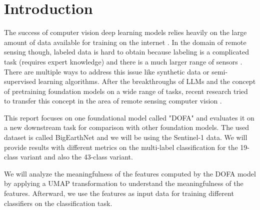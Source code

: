 \section{Introduction}
\label{sec:intro}

The success of computer vision deep learning models relies heavily on the large amount of data available for training on the internet \cite{8237359}.
In the domain of remote sensing though, labeled data is hard to obtain because labeling is a complicated task (requires expert knowledge) and there is a much larger range of sensors \cite{dofa}.
There are multiple ways to address this issue like synthetic data or semi-supervised learning algorithms. After the breakthroughs of LLMs and the concept of pretraining foundation models on a wide range of tasks, recent research tried to transfer this concept in the area of remote sensing computer vision \cite{bommasani2022opportunitiesrisksfoundationmodels}.

This report focuses on one foundational model called "DOFA" \cite{dofa}
and evaluates it on a new downstream task for comparison with other foundation models. The used dataset is called BigEarthNet \cite{bigearthnet}
and we will be using the Sentinel-1 data. We will provide results with different metrics on the multi-label classification for the 19-class variant and also the 43-class variant.

We will analyze the meaningfulness of the features computed by the DOFA model by applying a UMAP transformation \cite{umap-paper}
to understand the meaningfulness of the features. Afterward, we use the features as input data for training different classifiers on the classification task.


